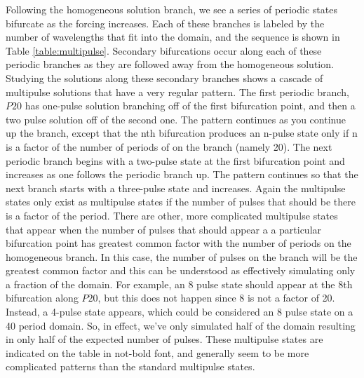 \documentclass[api,pof,pre,12pt,a4paper]{revtex4-1}
\begin{document}
Following the homogeneous solution branch, we see a series of periodic states bifurcate as the forcing increases.  Each of these branches is labeled by the number of wavelengths that fit into the domain, and the sequence is shown in Table \ref{table:multipulse}.  Secondary bifurcations occur along each of these periodic branches as they are followed away from the homogeneous solution.  Studying the solutions along these secondary branches shows a cascade of multipulse solutions that have a very regular pattern.  The first periodic branch, $P20$ has  one-pulse solution branching off of the first bifurcation point, and then a two pulse solution off of the second one.  The pattern continues as you continue up the branch, except that the nth bifurcation produces an n-pulse state only if n is a factor of the number of periods of  on the branch (namely 20).  The next periodic branch begins with a two-pulse state at the first bifurcation point and increases as one follows the periodic branch up.  The pattern continues so that the next branch starts with a three-pulse state and increases.  Again the multipulse states only exist as multipulse states if the number of pulses that should be there is a factor of the period.  There are other, more complicated multipulse states that appear when the number of pulses that should appear a a particular bifurcation point has greatest common factor with the number of periods on the homogeneous branch.  In this case, the number of pulses on the branch will be the greatest common factor and this can be understood as effectively simulating only a fraction of the domain.  For example, an 8 pulse state should appear at the 8th bifurcation along $P20$, but this does not happen since 8 is not a factor of 20.  Instead, a 4-pulse state appears, which could be considered an 8 pulse state on a 40 period domain.  So, in effect, we've only simulated half of the domain resulting in only half of the expected number of pulses.  These multipulse states are indicated on the table in not-bold font, and generally seem to be more complicated patterns than the standard multipulse states.    
\end{document}
